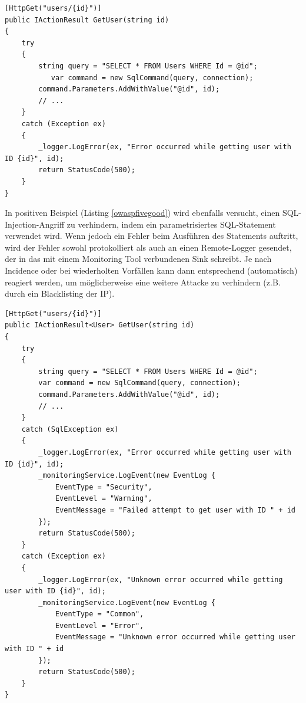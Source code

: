 \documentclass[notitlepage, hidelinks]{article}
\begin{document}
\begin{lstlisting}[language={[Sharp]C},frame=single,caption=Negativbeispiel Improper Assets Management,label=owaspfivebad]
[HttpGet("users/{id}")]
public IActionResult GetUser(string id)
{
    try
    {
        string query = "SELECT * FROM Users WHERE Id = @id";
    	   var command = new SqlCommand(query, connection);
        command.Parameters.AddWithValue("@id", id);
        // ...
    }
    catch (Exception ex)
    {
        _logger.LogError(ex, "Error occurred while getting user with ID {id}", id);
        return StatusCode(500);
    }
}
\end{lstlisting}

In positiven Beispiel (Listing \ref{owaspfivegood}) wird ebenfalls versucht, einen SQL-Injection-Angriff zu verhindern, indem ein parametrisiertes SQL-Statement verwendet wird. Wenn jedoch ein Fehler beim Ausführen des Statements auftritt, wird der Fehler sowohl protokolliert als auch an einen Remote-Logger gesendet, der in das mit einem Monitoring Tool verbundenen Sink schreibt. Je nach Incidence oder bei wiederholten Vorfällen kann dann entsprechend (automatisch) reagiert werden, um möglicherweise eine weitere Attacke zu verhindern (z.B. durch ein Blacklisting der IP).

\begin{lstlisting}[language={[Sharp]C},frame=single,caption=Positivbeispiel Improper Assets Management,label=owaspfivegood]
[HttpGet("users/{id}")]
public IActionResult<User> GetUser(string id)
{
    try
    {
        string query = "SELECT * FROM Users WHERE Id = @id";
        var command = new SqlCommand(query, connection);
        command.Parameters.AddWithValue("@id", id);
        // ...
    }
    catch (SqlException ex)
    {
        _logger.LogError(ex, "Error occurred while getting user with ID {id}", id);
        _monitoringService.LogEvent(new EventLog { 
            EventType = "Security",
            EventLevel = "Warning",
            EventMessage = "Failed attempt to get user with ID " + id
        });
        return StatusCode(500);
    }
    catch (Exception ex)
    {
        _logger.LogError(ex, "Unknown error occurred while getting user with ID {id}", id);
        _monitoringService.LogEvent(new EventLog { 
            EventType = "Common",
            EventLevel = "Error",
            EventMessage = "Unknown error occurred while getting user with ID " + id
        });
        return StatusCode(500);
    }
}
\end{lstlisting}
\end{document}
